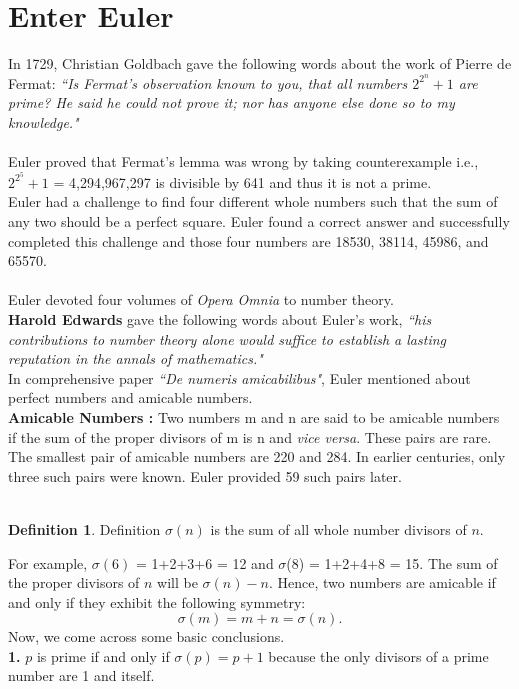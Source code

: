 \documentclass[a4paper,reqno,11pt]{book}
\theoremstyle{plain}%
\theoremstyle{definition}
\newtheorem{defn}{Definition}[chapter]
\begin{document}
\section{Enter Euler}
In 1729, Christian Goldbach gave the following words about the work of Pierre de Fermat: 
\textit{``Is Fermat's observation known to you, that all numbers $2^{2^n} + 1$ are 
prime? He said he could not prove it; nor has anyone else done so to 
my knowledge."}\\
\\
Euler proved that Fermat's lemma was 
wrong by taking counterexample i.e., $2^{2^5}+1$
 = 4,294,967,297 is divisible by 641 \cite{ref 3} and thus it is not a prime.\\
Euler had a challenge to find four different whole numbers such that the sum 
of any two should be a perfect square. Euler found a correct answer and successfully completed this challenge and those four numbers are 18530, 
38114, 45986, and 65570.\\
\\
Euler devoted four volumes of \textit{Opera Omnia} to number theory.\\ \textbf{Harold Edwards} gave the following words about Euler's work, \textit{``his contributions to number theory alone would suffice 
to establish a lasting reputation in the annals of mathematics."}\\
In comprehensive paper \textit{``De numeris amicabilibus"}, Euler mentioned about perfect numbers and amicable numbers.\\
\textbf{Amicable Numbers : } Two numbers m and n are said to be amicable numbers if the sum of the proper divisors of m is n and \textit{vice versa}. These pairs are rare. The smallest pair of amicable numbers are 
220 and 284. In earlier centuries, only three such pairs were known. Euler provided 59 such pairs later.\\
\\
\begin{defn}{Definition} $\sigma(n)$ is the sum of all whole number divisors of $n$.\\
\end{defn}
For example, $\sigma(6)$ = 1+2+3+6 = 12 and $\sigma$(8) = 1+2+4+8 = 15.
The sum of the proper divisors of $n$ will be $\sigma(n) - n$. Hence, two numbers are amicable if and only if they exhibit the following symmetry:
$$\sigma(m) = m+n = \sigma(n).$$
Now, we come across some basic conclusions.\\
\textbf{1.} $p$ is prime if and only if $\sigma(p) = p + 1$ because the only divisors of a prime number are 1 and itself.\\
\end{document}
